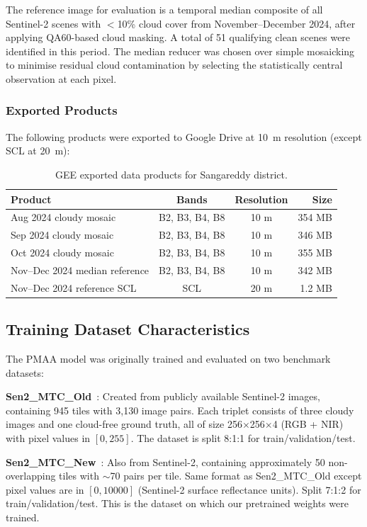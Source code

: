 \documentclass[12pt,a4paper]{article}
\begin{document}
The reference image for evaluation is a temporal median composite of all Sentinel-2 scenes with $<$10\% cloud cover from November--December 2024, after applying QA60-based cloud masking. A total of 51 qualifying clean scenes were identified in this period. The median reducer was chosen over simple mosaicking to minimise residual cloud contamination by selecting the statistically central observation at each pixel.

\subsubsection{Exported Products}

The following products were exported to Google Drive at 10~m resolution (except SCL at 20~m):

\begin{table}[H]
\centering
\caption{GEE exported data products for Sangareddy district.}
\label{tab:exports}
\begin{tabular}{lccr}
\toprule
\textbf{Product} & \textbf{Bands} & \textbf{Resolution} & \textbf{Size} \\
\midrule
Aug 2024 cloudy mosaic & B2, B3, B4, B8 & 10 m & 354 MB \\
Sep 2024 cloudy mosaic & B2, B3, B4, B8 & 10 m & 346 MB \\
Oct 2024 cloudy mosaic & B2, B3, B4, B8 & 10 m & 355 MB \\
Nov--Dec 2024 median reference & B2, B3, B4, B8 & 10 m & 342 MB \\
Nov--Dec 2024 reference SCL & SCL & 20 m & 1.2 MB \\
\bottomrule
\end{tabular}
\end{table}

\subsection{Training Dataset Characteristics}

The PMAA model was originally trained and evaluated on two benchmark datasets:

\textbf{Sen2\_MTC\_Old}~\cite{sarukkai2020cloud}: Created from publicly available Sentinel-2 images, containing 945 tiles with 3,130 image pairs. Each triplet consists of three cloudy images and one cloud-free ground truth, all of size 256$\times$256$\times$4 (RGB + NIR) with pixel values in $[0, 255]$. The dataset is split 8:1:1 for train/validation/test.

\textbf{Sen2\_MTC\_New}~\cite{huang2022ctgan}: Also from Sentinel-2, containing approximately 50 non-overlapping tiles with ${\sim}$70 pairs per tile. Same format as Sen2\_MTC\_Old except pixel values are in $[0, 10000]$ (Sentinel-2 surface reflectance units). Split 7:1:2 for train/validation/test. This is the dataset on which our pretrained weights were trained.
\end{document}
